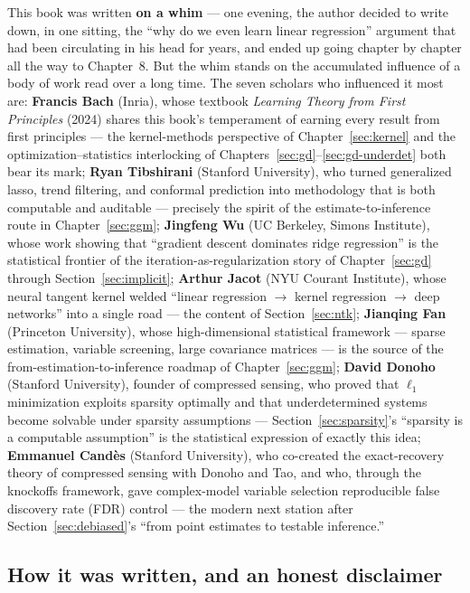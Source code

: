 This book was written \textbf{on a whim} --- one evening, the author decided to write down, in one sitting, the ``why do we even learn linear regression'' argument that had been circulating in his head for years, and ended up going chapter by chapter all the way to Chapter~8. But the whim stands on the accumulated influence of a body of work read over a long time. The seven scholars who influenced it most are: \textbf{Francis Bach} (Inria), whose textbook \emph{Learning Theory from First Principles} (2024)\cite{bach2024} shares this book's temperament of earning every result from first principles --- the kernel-methods perspective of Chapter~\ref{sec:kernel} and the optimization--statistics interlocking of Chapters~\ref{sec:gd}--\ref{sec:gd-underdet} both bear its mark; \textbf{Ryan Tibshirani} (Stanford University), who turned generalized lasso, trend filtering, and conformal prediction into methodology that is both computable and auditable --- precisely the spirit of the estimate-to-inference route in Chapter~\ref{sec:ggm}; \textbf{Jingfeng Wu} (UC Berkeley, Simons Institute), whose work showing that ``gradient descent dominates ridge regression''\cite{wu2025} is the statistical frontier of the iteration-as-regularization story of Chapter~\ref{sec:gd} through Section~\ref{sec:implicit}; \textbf{Arthur Jacot} (NYU Courant Institute), whose neural tangent kernel\cite{jacot2018} welded ``linear regression $\to$ kernel regression $\to$ deep networks'' into a single road --- the content of Section~\ref{sec:ntk}; \textbf{Jianqing Fan} (Princeton University), whose high-dimensional statistical framework\cite{fan2020} --- sparse estimation, variable screening, large covariance matrices --- is the source of the from-estimation-to-inference roadmap of Chapter~\ref{sec:ggm}; \textbf{David Donoho} (Stanford University), founder of compressed sensing, who proved that $\ell_1$ minimization exploits sparsity optimally and that underdetermined systems become solvable under sparsity assumptions\cite{donoho2006} --- Section~\ref{sec:sparsity}'s ``sparsity is a computable assumption'' is the statistical expression of exactly this idea; \textbf{Emmanuel Cand\`es} (Stanford University), who co-created the exact-recovery theory of compressed sensing with Donoho and Tao, and who, through the knockoffs framework, gave complex-model variable selection reproducible false discovery rate (FDR) control\cite{barber2015} --- the modern next station after Section~\ref{sec:debiased}'s ``from point estimates to testable inference.''

\subsection*{How it was written, and an honest disclaimer}

